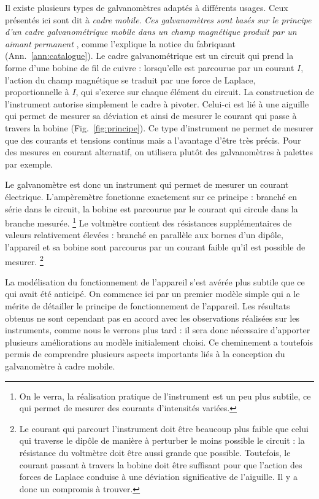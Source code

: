 \documentclass[12pt,a4paper,fleqn]{article}
\begin{document}
Il existe plusieurs types de galvanomètres adaptés à différents usages.
Ceux présentés ici sont dit à \emph{cadre mobile}.
\og \emph{Ces galvanomètres sont basés sur le principe d'un cadre galvanométrique mobile dans un champ magnétique produit par un aimant permanent} \fg{}, comme l'explique la notice du fabriquant (Ann.~\ref{ann:catalogue}).
Le cadre galvanométrique est un circuit qui prend la forme d'une bobine de fil de cuivre : lorsqu'elle est parcourue par un courant $I$, l'action du champ magnétique se traduit par une force de Laplace, proportionnelle à $I$, qui s'exerce sur chaque élément du circuit.
La construction de l'instrument autorise simplement le cadre à pivoter.
Celui-ci est lié à une aiguille qui permet de mesurer sa déviation et ainsi de mesurer le courant qui passe à travers la bobine (Fig.~\ref{fig:principe}).
Ce type d'instrument ne permet de mesurer que des courants et tensions continus mais a l'avantage d'être très précis.
Pour des mesures en courant alternatif, on utilisera plutôt des galvanomètres à palettes par exemple.

Le galvanomètre est donc un instrument qui permet de mesurer un courant électrique.
L'ampèremètre fonctionne exactement sur ce principe : branché en série dans le circuit, la bobine est parcourue par le courant qui circule dans la branche mesurée.
\footnote{On le verra, la réalisation pratique de l'instrument est un peu plus subtile, ce qui permet de mesurer des courants d'intensités variées.} 
Le voltmètre contient des résistances supplémentaires de valeurs relativement élevées : branché en parallèle aux bornes d'un dipôle, l'appareil et sa bobine sont parcourus par un courant faible qu'il est possible de mesurer.
\footnote{Le courant qui parcourt l'instrument doit être beaucoup plus faible que celui qui traverse le dipôle de manière à perturber le moins possible le circuit : la résistance du voltmètre doit être aussi grande que possible.
Toutefois, le courant passant à travers la bobine doit être suffisant pour que l'action des forces de Laplace conduise à une déviation significative de l'aiguille.
Il y a donc un compromis à trouver.}

La modélisation du fonctionnement de l'appareil s'est avérée plus subtile que ce qui avait été anticipé.
On commence ici par un premier modèle simple qui a le mérite de détailler le principe de fonctionnement de l'appareil.
Les résultats obtenus ne sont cependant pas en accord avec les observations réalisées sur les instruments, comme nous le verrons plus tard : il sera donc nécessaire d'apporter plusieurs améliorations au modèle initialement choisi.
Ce cheminement a toutefois permis de comprendre plusieurs aspects importants liés à la conception du galvanomètre à cadre mobile.
\end{document}
